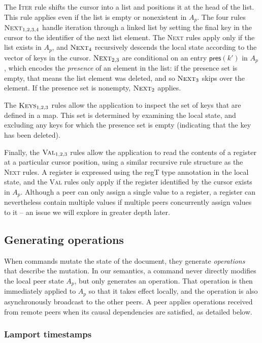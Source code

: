 \documentclass[a4paper,twocolumn,10pt]{article}
\begin{document}
The \textsc{Iter} rule shifts the cursor into a list and positions it at the \textsf{head} of the list. This rule applies even if the list is empty or nonexistent in $A_p$. The four rules $\textsc{Next}_{1,2,3,4}$ handle iteration through a linked list by setting the final key in the cursor to the identifier of the next list element. The \textsc{Next} rules apply only if the list exists in $A_p$, and $\textsc{Next}_4$ recursively descends the local state according to the vector of keys in the cursor. $\textsc{Next}_{2,3}$ are conditional on an entry $\mathsf{pres}(k')$ in $A_p$, which encodes the \emph{presence} of an element in the list: if the presence set is empty, that means the list element was deleted, and so $\textsc{Next}_3$ skips over the element. If the presence set is nonempty, $\textsc{Next}_2$ applies.

The $\textsc{Keys}_{1,2,3}$ rules allow the application to inspect the set of keys that are defined in a map. This set is determined by examining the local state, and excluding any keys for which the presence set is empty (indicating that the key has been deleted).

Finally, the $\textsc{Val}_{1,2,3}$ rules allow the application to read the contents of a register at a particular cursor position, using a similar recursive rule structure as the \textsc{Next} rules. A register is expressed using the \textsf{regT} type annotation in the local state, and the \textsc{Val} rules only apply if the register identified by the cursor exists in $A_p$. Although a peer can only assign a single value to a register, a register can nevertheless contain multiple values if multiple peers concurrently assign values to it -- an issue we will explore in greater depth later.

\subsection{Generating operations}

When commands mutate the state of the document, they generate \emph{operations} that describe the mutation. In our semantics, a command never directly modifies the local peer state $A_p$, but only generates an operation. That operation is then immediately applied to $A_p$ so that it takes effect locally, and the operation is also asynchronously broadcast to the other peers. A peer applies operations received from remote peers when its causal dependencies are satisfied, as detailed below.

\subsubsection{Lamport timestamps}
\end{document}
